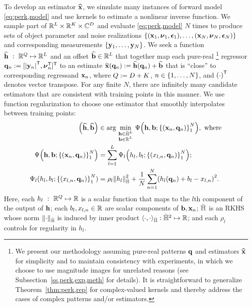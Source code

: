 To develop an estimator $\widehat{\mathbf{x}}$,
we simulate many instances 
of forward model \eqref{eq:perk,model}
and use kernels
to estimate a nonlinear inverse function.
We sample part of $\mathbb{R}^{L} \times \mathbb{R}^{K} \times \mathbb{C}^{D}$
and evaluate \eqref{eq:perk,model} $N$ times
to produce sets of object parameter and noise realizations
$\set{\paren{\bmx_1,\bmnu_1,\bmeps_1},\dots,\paren{\bmx_N,\bmnu_N,\bmeps_N}}$
and corresponding measurements
$\set{\bmy_1,\dots,\bmy_N}$. 
We seek a function
$\widehat{\mathbf{h}}~:~\mathbb{R}^{Q} \mapsto \mathbb{R}^{L}$
and an offset $\widehat{\mathbf{b}} \in \mathbb{R}^{L}$
that together map each pure-real
\footnote{%
	We present our methodology 
	assuming pure-real patterns $\mathbf{q}$ 
	and estimators $\widehat{\mathbf{x}}$
	for simplicity and 
	to maintain consistency
	with experiments,
	in which we choose to use magnitude images
	for unrelated reasons 
	(see Subsection~\ref{ss,perk,exp,meth} for details). 
	It is straightforward 
	to generalize Theorem~\ref{thm:perk,rep}
	for complex-valued kernels 
	and thereby address the cases 
	of complex patterns and/or estimators.
}
regressor $\bmq_n := [\abs{\bmy_n}\tpose, \bmnu_n\tpose]\tpose$
to an estimate 
$\bmxha{\bmq_n} := \bmhha{\bmq_n}+\est{\bmb}$ 
that is ``close'' 
to corresponding regressand $\mathbf{x}_n$,
where $Q := D+K$,
$n \in \set{1,\dots,N}$,
and $\paren{\cdot}\tpose$ denotes vector transpose.
For any finite $N$,
there are infinitely many candidate estimators
that are consistent with training points
in this manner.
We use function regularization
to choose one estimator
that smoothly interpolates 
between training points:
\begin{align}
	\paren{\est{\bmh},\est{\bmb}} &\in 
		\argmin{\substack{\bmh \in \rkhs^L \\ \bmb \in \reals{L}}}
		\costa{\bmh, \bmb; \set{\paren{\bmx_n,\bmq_n}}_{1}^N}, 
		\where \label{eq:perk,prob} \\
	\costa{\bmh, \bmb; \set{\paren{\bmx_n,\bmq_n}}_{1}^N} &= 
		\sum_{l=1}^L \cost_l\paren{h_l,b_l; \set{\paren{x_{l,n},\bmq_n}}_{1}^N}; 
		\label{eq:perk,cost} \\
	\Psi_l(h_l,b_l; \set{\paren{x_{l,n},\bmq_n}}_{1}^N) &= 
		\rho_l \norm{h_l}_\rkhs^2 + 
		\frac{1}{N} \sum_{n=1}^N \paren{h_l(\bmq_n) + b_l - x_{l,n}}^2.
		\label{eq:perk,cost-l}
\end{align}
Here, each $h_l~:~\mathbb{R}^{Q} \mapsto \mathbb{R}$ is a scalar function
that maps to the $l$th component of the output of $\mathbf{h}$; 
each $b_l,x_{l,n} \in \mathbb{R}$ are scalar components of $\mathbf{b},\mathbf{x}_n$;
${\bar{\mathbb{H}}}$ is an RKHS 
whose norm $\norm{\cdot}_\rkhs$ 
is induced by inner product 
$\langle \cdot,\cdot \rangle_{\bar{\mathbb{H}}} : {\bar{\mathbb{H}}}^2 \mapsto \mathbb{R}$; 
and each $\rho_l$ controls for regularity in $h_l$.

